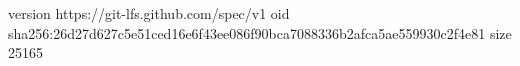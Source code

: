 version https://git-lfs.github.com/spec/v1
oid sha256:26d27d627c5e51ced16e6f43ee086f90bca7088336b2afca5ae559930c2f4e81
size 25165
